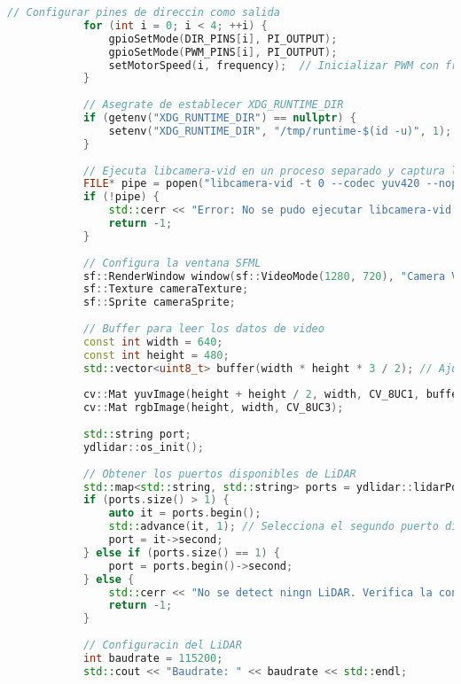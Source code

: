 \begin{lstlisting}[language={C++}, caption={Primer ajuste de c\'odigo}, label={Script}]
            // Configurar pines de direccin como salida
            for (int i = 0; i < 4; ++i) {
                gpioSetMode(DIR_PINS[i], PI_OUTPUT);
                gpioSetMode(PWM_PINS[i], PI_OUTPUT);
                setMotorSpeed(i, frequency);  // Inicializar PWM con frecuencia inicial
            }
        
            // Asegrate de establecer XDG_RUNTIME_DIR
            if (getenv("XDG_RUNTIME_DIR") == nullptr) {
                setenv("XDG_RUNTIME_DIR", "/tmp/runtime-$(id -u)", 1);
            }
        
            // Ejecuta libcamera-vid en un proceso separado y captura la salida en YUV, sin previsualizacn
            FILE* pipe = popen("libcamera-vid -t 0 --codec yuv420 --nopreview -o -", "r");
            if (!pipe) {
                std::cerr << "Error: No se pudo ejecutar libcamera-vid." << std::endl;
                return -1;
            }
        
            // Configura la ventana SFML
            sf::RenderWindow window(sf::VideoMode(1280, 720), "Camera Visualization with LiDAR");
            sf::Texture cameraTexture;
            sf::Sprite cameraSprite;
        
            // Buffer para leer los datos de video
            const int width = 640;
            const int height = 480;
            std::vector<uint8_t> buffer(width * height * 3 / 2); // Ajusta el tamao del buffer para YUV420
        
            cv::Mat yuvImage(height + height / 2, width, CV_8UC1, buffer.data());
            cv::Mat rgbImage(height, width, CV_8UC3);
        
            std::string port;
            ydlidar::os_init();
        
            // Obtener los puertos disponibles de LiDAR
            std::map<std::string, std::string> ports = ydlidar::lidarPortList();
            if (ports.size() > 1) {
                auto it = ports.begin();
                std::advance(it, 1); // Selecciona el segundo puerto disponible
                port = it->second;
            } else if (ports.size() == 1) {
                port = ports.begin()->second;
            } else {
                std::cerr << "No se detect ningn LiDAR. Verifica la conexin." << std::endl;
                return -1;
            }
        
            // Configuracin del LiDAR
            int baudrate = 115200;
            std::cout << "Baudrate: " << baudrate << std::endl;
        

\end{lstlisting}

